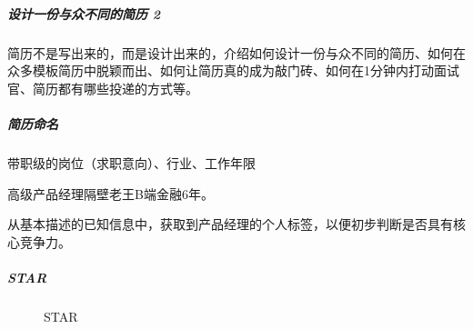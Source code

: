 \documentclass[letterpaper,10pt,english]{sphinxmanual}
\begin{document}
\subparagraph{设计一份与众不同的简历 2\sphinxfootnotemark[842]}
\label{\detokenize{chapter_interview/CV:id1}}%
\begin{footnotetext}[842]\sphinxAtStartFootnote
{}
%
\end{footnotetext}\ignorespaces 
简历不是写出来的，而是设计出来的，介绍如何设计一份与众不同的简历、如何在众多模板简历中脱颖而出、如何让简历真的成为敲门砖、如何在1分钟内打动面试官、简历都有哪些投递的方式等。


\subparagraph{简历命名}
\label{\detokenize{chapter_interview/CV:id2}}
带职级的岗位（求职意向）、行业、工作年限

高级产品经理\sphinxhyphen{}隔壁老王\sphinxhyphen{}B端金融\sphinxhyphen{}6年。

从基本描述的已知信息中，获取到产品经理的个人标签，以便初步判断是否具有核心竞争力。
%
\begin{footnote}[843]\sphinxAtStartFootnote
{}
%
\end{footnote}


\subparagraph{STAR}
\label{\detokenize{chapter_interview/CV:star}}
\begin{figure}[H]
\centering
\capstart

\noindent{}
\caption{STAR}\label{\detokenize{chapter_interview/CV:id8}}\end{figure}
\end{document}
